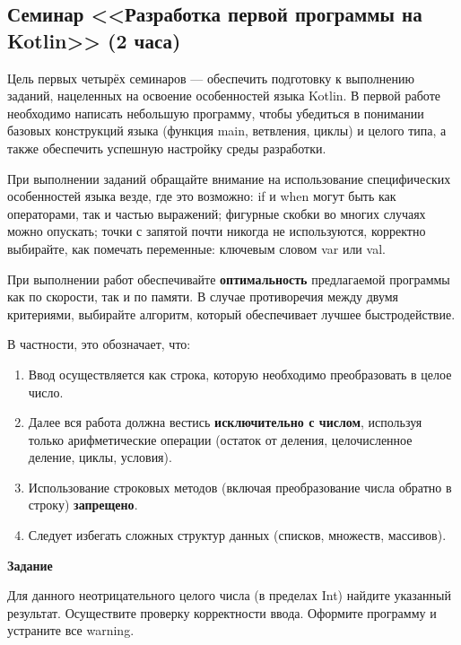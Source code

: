 \subsection{Семинар <<Разработка первой программы на Kotlin>> (2 часа)}

Цель первых четырёх семинаров — обеспечить подготовку к выполнению заданий, 
нацеленных на освоение особенностей языка Kotlin. В первой работе
необходимо написать небольшую программу, чтобы убедиться в понимании
базовых конструкций языка (функция main, ветвления, циклы) и целого типа, а также обеспечить успешную настройку среды разработки.

При выполнении заданий обращайте внимание на использование специфических особенностей языка везде, где это возможно: 
if и when могут быть как операторами, так и частью выражений; фигурные скобки во многих случаях можно опускать;
точки с запятой почти никогда не используются, корректно выбирайте, как помечать переменные: ключевым словом var или val.

При выполнении работ обеспечивайте \textbf{оптимальность} предлагаемой программы как по скорости, так и по памяти. В
случае противоречия между двумя критериями, выбирайте алгоритм, который обеспечивает лучшее быстродействие.

В частности, это обозначает, что:
\begin{enumerate}
    \item Ввод осуществляется как строка, которую необходимо преобразовать в целое число.
    \item Далее вся работа должна вестись \textbf{исключительно с числом}, используя только арифметические операции (остаток от деления, целочисленное деление, циклы, условия).
    \item Использование строковых методов (включая преобразование числа обратно в строку) \textbf{запрещено}.
    \item Следует избегать сложных структур данных (списков, множеств, массивов).
\end{enumerate}

\textbf{Задание} %

Для данного неотрицательного целого числа (в пределах Int)
найдите указанный результат. Осуществите проверку 
корректности ввода. Оформите программу и устраните все warning.

